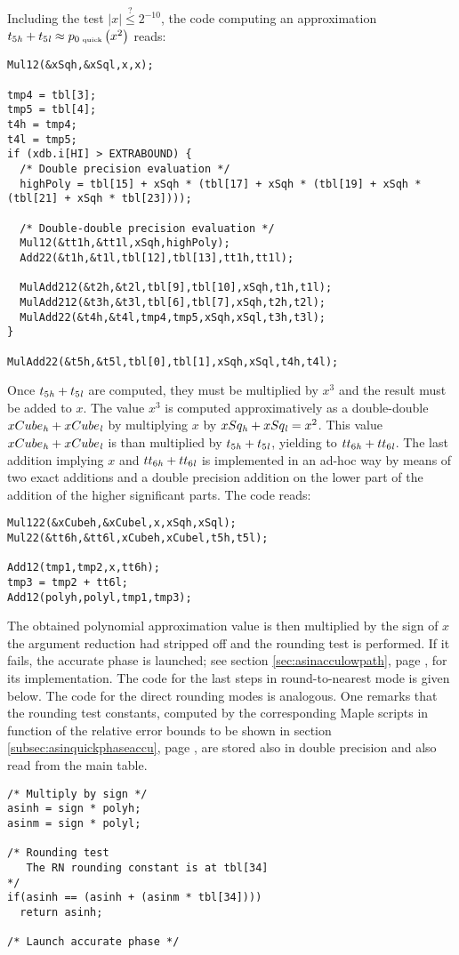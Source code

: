 Including the test $\left \vert x \right \vert \stackrel{?}{\leq} 2^{-10}$, the code computing
an approximation $t_{5\mathit{h}} + t_{5\mathit{l}} \approx p_{0\mbox{\tiny ~quick}}\left( x^2 \right)$ reads:
\begin{lstlisting}[caption={Low path quick phase polynomial approximation (higher degrees)},firstnumber=1]
Mul12(&xSqh,&xSql,x,x);

tmp4 = tbl[3];
tmp5 = tbl[4];
t4h = tmp4;
t4l = tmp5;
if (xdb.i[HI] > EXTRABOUND) {
  /* Double precision evaluation */
  highPoly = tbl[15] + xSqh * (tbl[17] + xSqh * (tbl[19] + xSqh * (tbl[21] + xSqh * tbl[23])));

  /* Double-double precision evaluation */
  Mul12(&tt1h,&tt1l,xSqh,highPoly);
  Add22(&t1h,&t1l,tbl[12],tbl[13],tt1h,tt1l);

  MulAdd212(&t2h,&t2l,tbl[9],tbl[10],xSqh,t1h,t1l);
  MulAdd212(&t3h,&t3l,tbl[6],tbl[7],xSqh,t2h,t2l);
  MulAdd22(&t4h,&t4l,tmp4,tmp5,xSqh,xSql,t3h,t3l);
}

MulAdd22(&t5h,&t5l,tbl[0],tbl[1],xSqh,xSql,t4h,t4l);
\end{lstlisting}
Once $t_{5\mathit{h}} + t_{5\mathit{l}}$ are computed, they must be multiplied by
$x^3$ and the result must be added to $x$.  The value $x^3$ is
computed approximatively as a double-double $xCube_{\mathit{h}} + xCube_{\mathit{l}}$ by
multiplying $x$ by $xSq_{\mathit{h}} + xSq_{\mathit{l}} = x^2$. This value $xCube_{\mathit{h}} +
xCube_{\mathit{l}}$ is than multiplied by $t_{5\mathit{h}} + t_{5\mathit{l}}$, yielding to
$tt_{6\mathit{h}} + tt_{6\mathit{l}}$. The last addition implying $x$ and $tt_{6\mathit{h}}
+ tt_{6\mathit{l}}$ is implemented in an ad-hoc way by means of two exact
additions and a double precision addition on the lower part of the
addition of the higher significant parts. The code reads:
\begin{lstlisting}[caption={Low path quick phase polynomial approximation (lower degrees)},firstnumber=1]
Mul122(&xCubeh,&xCubel,x,xSqh,xSql);
Mul22(&tt6h,&tt6l,xCubeh,xCubel,t5h,t5l);

Add12(tmp1,tmp2,x,tt6h);
tmp3 = tmp2 + tt6l;
Add12(polyh,polyl,tmp1,tmp3);
\end{lstlisting}
The obtained polynomial approximation value is then multiplied by the
sign of $x$ the argument reduction had stripped off and the rounding
test is performed.  If it fails, the accurate phase is launched; see
section \ref{sec:asinacculowpath}, page \pageref{sec:asinacculowpath},
for its implementation.  The code for the last steps in
round-to-nearest mode is given below. The code for the direct rounding
modes is analogous. One remarks that the rounding test constants,
computed by the corresponding Maple scripts in function of the
relative error bounds to be shown in section
\ref{subsec:asinquickphaseaccu}, page
\pageref{subsec:asinquickphaseaccu}, are stored also in double
precision and also read from the main table.
\begin{lstlisting}[caption={Low path quick phase rounding test},firstnumber=1]
/* Multiply by sign */
asinh = sign * polyh;
asinm = sign * polyl;

/* Rounding test
   The RN rounding constant is at tbl[34]
*/
if(asinh == (asinh + (asinm * tbl[34])))
  return asinh;

/* Launch accurate phase */
\end{lstlisting}

